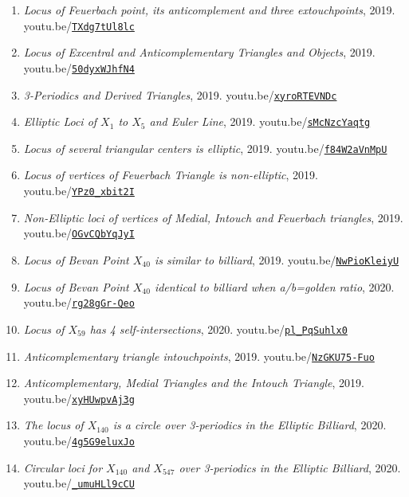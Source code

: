 \documentclass[12pt]{article}
\begin{document}
\begin{enumerate}[resume]
\item \textit{Locus of Feuerbach point, its anticomplement and three extouchpoints}, 2019. youtu.be/\href{https://youtu.be/TXdg7tUl8lc}{\nolinkurl{TXdg7tUl8lc}}
\item \textit{Locus of Excentral and Anticomplementary Triangles and Objects}, 2019. youtu.be/\href{https://youtu.be/50dyxWJhfN4}{\nolinkurl{50dyxWJhfN4}}
\item \textit{3-Periodics and Derived Triangles}, 2019. youtu.be/\href{https://youtu.be/xyroRTEVNDc}{\nolinkurl{xyroRTEVNDc}}
\item \textit{Elliptic Loci of $X_{1}$ to $X_{5}$ and Euler Line}, 2019. youtu.be/\href{https://youtu.be/sMcNzcYaqtg}{\nolinkurl{sMcNzcYaqtg}}
\item \textit{Locus of several triangular centers is elliptic}, 2019. youtu.be/\href{https://youtu.be/f84W2aVnMpU}{\nolinkurl{f84W2aVnMpU}}
\item \textit{Locus of vertices of Feuerbach Triangle is non-elliptic}, 2019. youtu.be/\href{https://youtu.be/YPz0_xbit2I}{\nolinkurl{YPz0\_xbit2I}}
\item \textit{Non-Elliptic loci of vertices of Medial, Intouch and Feuerbach triangles}, 2019. youtu.be/\href{https://youtu.be/OGvCQbYqJyI}{\nolinkurl{OGvCQbYqJyI}}
\item \textit{Locus of Bevan Point $X_{40}$ is similar to billiard}, 2019. youtu.be/\href{https://youtu.be/NwPioKleiyU}{\nolinkurl{NwPioKleiyU}}
\item \textit{Locus of Bevan Point $X_{40}$ identical to billiard when a/b=golden ratio}, 2020. youtu.be/\href{https://youtu.be/rg28gGr-Qeo}{\nolinkurl{rg28gGr-Qeo}}
\item \textit{Locus of $X_{59}$ has 4 self-intersections}, 2020. youtu.be/\href{https://youtu.be/pl_PqSuhlx0}{\nolinkurl{pl\_PqSuhlx0}}
\item \textit{Anticomplementary triangle intouchpoints}, 2019. youtu.be/\href{https://youtu.be/NzGKU75-Fuo}{\nolinkurl{NzGKU75-Fuo}}
\item \textit{Anticomplementary, Medial Triangles and the Intouch Triangle}, 2019. youtu.be/\href{https://youtu.be/xyHUwpvAj3g}{\nolinkurl{xyHUwpvAj3g}}
\item \textit{The locus of $X_{140}$ is a circle over 3-periodics in the Elliptic Billiard}, 2020. youtu.be/\href{https://youtu.be/4g5G9eluxJo}{\nolinkurl{4g5G9eluxJo}}
\item \textit{Circular loci for $X_{140}$ and $X_{547}$ over 3-periodics in the Elliptic Billiard}, 2020. youtu.be/\href{https://youtu.be/_umuHLl9cCU}{\nolinkurl{\_umuHLl9cCU}}

\end{enumerate}
\end{document}
